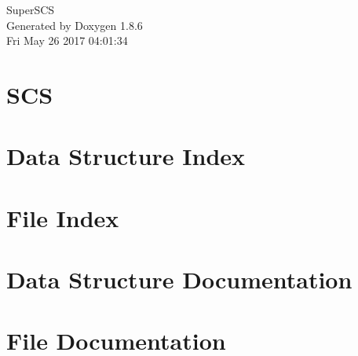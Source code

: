 \documentclass[twoside]{book}
\newcommand{\clearemptydoublepage}{%
  \newpage{\pagestyle{empty}\cleardoublepage}%
}
\begin{document}
\hypersetup{pageanchor=false}
\begin{titlepage}
\vspace*{7cm}
\begin{center}%
{\Large Super\-S\-C\-S }\\
\vspace*{1cm}
{\large Generated by Doxygen 1.8.6}\\
\vspace*{0.5cm}
{\small Fri May 26 2017 04:01:34}\\
\end{center}
\end{titlepage}
\clearemptydoublepage
\tableofcontents
\clearemptydoublepage
{}
\hypersetup{pageanchor=true}

\chapter{S\-C\-S}
\label{md__r_e_a_d_m_e}
\hypertarget{md__r_e_a_d_m_e}{}

\chapter{Data Structure Index}

\chapter{File Index}

\chapter{Data Structure Documentation}












\chapter{File Documentation}






















\newpage
{}
{}
\printindex
\end{document}
